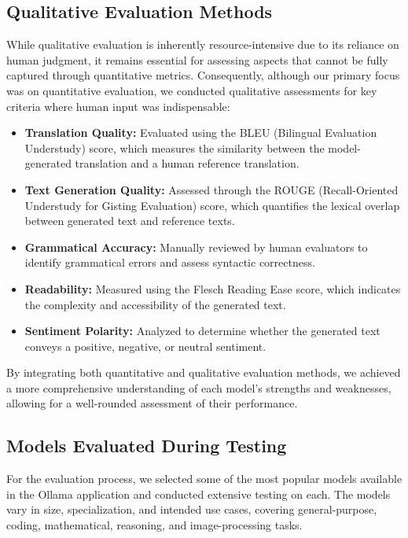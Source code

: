 \subsection{Qualitative Evaluation Methods}

While qualitative evaluation is inherently resource-intensive due to its reliance on human judgment, it remains essential for assessing aspects that cannot be fully captured through quantitative metrics. Consequently, although our primary focus was on quantitative evaluation, we conducted qualitative assessments for key criteria where human input was indispensable:

\begin{itemize}
  \item \textbf{Translation Quality:} Evaluated using the BLEU (Bilingual Evaluation Understudy) score, which measures the similarity between the model-generated translation and a human reference translation. \cite{BLUE-Score-Wikipedia}
  \item \textbf{Text Generation Quality:} Assessed through the ROUGE (Recall-Oriented Understudy for Gisting Evaluation) score, which quantifies the lexical overlap between generated text and reference texts.
  \item \textbf{Grammatical Accuracy:} Manually reviewed by human evaluators to identify grammatical errors and assess syntactic correctness.
  \item \textbf{Readability:} Measured using the Flesch Reading Ease score, which indicates the complexity and accessibility of the generated text.
  \item \textbf{Sentiment Polarity:} Analyzed to determine whether the generated text conveys a positive, negative, or neutral sentiment.
\end{itemize}

\cite{ROUGE-BLUE-Score}

By integrating both quantitative and qualitative evaluation methods, we achieved a more comprehensive understanding of each model’s strengths and weaknesses, allowing for a well-rounded assessment of their performance.

\subsection{Models Evaluated During Testing}

For the evaluation process, we selected some of the most popular models available in the Ollama application and conducted extensive testing on each. 
The models vary in size, specialization, and intended use cases, covering general-purpose, coding, mathematical, reasoning, and image-processing tasks.

